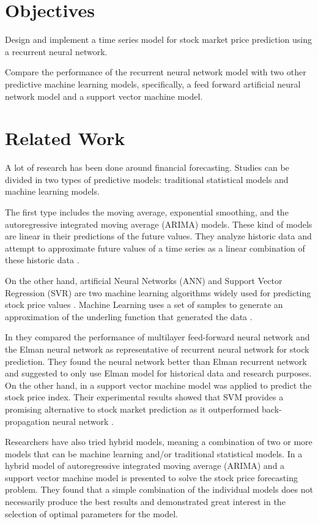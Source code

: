 \section{Objectives}
Design and implement a time series model for stock market price prediction using a recurrent neural network.

Compare the performance of the recurrent neural network model with two other predictive machine learning models, specifically, a feed forward artificial neural network model and a support vector machine model.

\section{Related Work}

A lot of research has been done around financial forecasting. Studies can be divided in two types of predictive models: traditional statistical models and machine learning models.

The first type includes the moving average, exponential smoothing, and the  autoregressive integrated moving average (ARIMA) models. These kind of models are linear in their predictions of the future values. They analyze historic data and attempt to approximate future values of a time series as a linear combination of these historic data \cite{shah2014performance}. 

On the other hand, artificial Neural Networks (ANN) and Support Vector Regression (SVR) are two machine learning algorithms widely used for predicting stock price values \cite{patel2015predicting}. Machine Learning uses a set of samples to generate an approximation of the underling function that generated the data \cite{shah2014performance}.

In \cite{shah2014performance} they compared the performance of multilayer feed-forward neural network and the Elman neural network as representative of recurrent neural network for stock prediction. They found the neural network  better than Elman recurrent network and suggested to only use Elman model for historical data and research purposes. On the other hand, in \cite{kim2003financial} a support vector machine model was applied to predict the stock price index. Their experimental results showed that SVM provides a promising alternative to stock market prediction as it outperformed back-propagation neural network .

Researchers have also tried hybrid models, meaning a combination of two or more models that can be machine learning and/or traditional statistical models. In \cite{pai2005hybrid} a hybrid model of autoregressive integrated moving average (ARIMA) and a support vector machine model is presented to solve the stock price forecasting problem. They found that a simple combination of the individual models does not necessarily produce the best results and demonstrated great interest in the selection of optimal parameters for the model.

